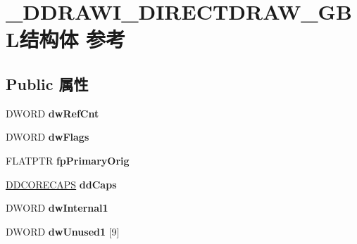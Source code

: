 \hypertarget{struct___d_d_r_a_w_i___d_i_r_e_c_t_d_r_a_w___g_b_l}{}\section{\+\_\+\+D\+D\+R\+A\+W\+I\+\_\+\+D\+I\+R\+E\+C\+T\+D\+R\+A\+W\+\_\+\+G\+B\+L结构体 参考}
\label{struct___d_d_r_a_w_i___d_i_r_e_c_t_d_r_a_w___g_b_l}
\subsection*{Public 属性}
\begin{DoxyCompactItemize}
\item 
\mbox{\label{struct___d_d_r_a_w_i___d_i_r_e_c_t_d_r_a_w___g_b_l_ab25646322515f1ba9faaa7bc383c4e9a}} 
D\+W\+O\+RD {\bfseries dw\+Ref\+Cnt}
\item 
\mbox{\label{struct___d_d_r_a_w_i___d_i_r_e_c_t_d_r_a_w___g_b_l_a4ffe4f16938bd0ff9313f22ce9dd8f3d}} 
D\+W\+O\+RD {\bfseries dw\+Flags}
\item 
\mbox{\label{struct___d_d_r_a_w_i___d_i_r_e_c_t_d_r_a_w___g_b_l_a0f228e3ebd209d3efdd3355568389080}} 
F\+L\+A\+T\+P\+TR {\bfseries fp\+Primary\+Orig}
\item 
\mbox{\label{struct___d_d_r_a_w_i___d_i_r_e_c_t_d_r_a_w___g_b_l_a67d87dc0b43e414d4b37fffce86923e3}} 
\hyperlink{struct___d_d_c_o_r_e_c_a_p_s}{D\+D\+C\+O\+R\+E\+C\+A\+PS} {\bfseries dd\+Caps}
\item 
\mbox{\label{struct___d_d_r_a_w_i___d_i_r_e_c_t_d_r_a_w___g_b_l_a03b6ff3359a6419cc7372fd2c3078838}} 
D\+W\+O\+RD {\bfseries dw\+Internal1}
\item 
\mbox{\label{struct___d_d_r_a_w_i___d_i_r_e_c_t_d_r_a_w___g_b_l_a9026aa92db8c000fbea3ceebe5e6eae4}} 
D\+W\+O\+RD {\bfseries dw\+Unused1} \mbox{[}9\mbox{]}
\item 

\end{DoxyCompactItemize}
